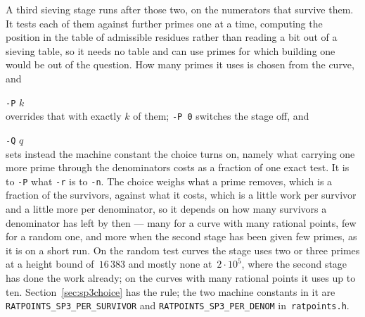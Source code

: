 \documentclass[12pt,a4paper,oneside]{amsart}
\begin{document}
A third sieving stage runs after those two, on the numerators that survive
them. It tests each of them against further primes one at a time, computing
the position in the table of admissible residues rather than reading a bit
out of a sieving table, so it needs no table and can use primes for which
building one would be out of the question. How many primes it uses is
chosen from the curve, and \\
\strut\quad\verb+-P+ $k$ \\
overrides that with exactly $k$ of them; \verb+-P 0+ switches the stage off,
and \\
\strut\quad\verb+-Q+ $q$ \\
sets instead the machine constant the choice turns on, namely what carrying
one more prime through the denominators costs as a fraction of one exact
test. It is to \verb+-P+ what \verb+-r+ is to \verb+-n+.
The choice weighs what a prime removes, which is a fraction of the survivors,
against what it costs, which is a little work per survivor and a little more
per denominator, so it depends on how many survivors a denominator has left
by then --- many for a curve with many rational points, few for a random one,
and more when the second stage has been given few primes, as it is on a
short run. On the random test curves the stage uses two or three primes at a
height bound of~$16\,383$ and mostly none at~$2\cdot10^5$, where the second
stage has done the work already; on the curves with many rational points it
uses up to ten. Section~\ref{sec:sp3choice} has the rule; the two machine constants in it
are \texttt{RATPOINTS\_SP3\_PER\_SURVIVOR} and
\texttt{RATPOINTS\_SP3\_PER\_DENOM} in~\texttt{ratpoints.h}.
\end{document}
